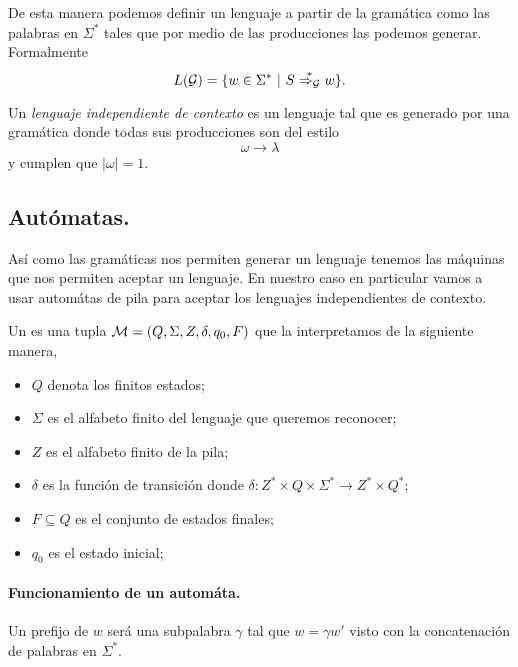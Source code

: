 \documentclass[tesis.tex]{subfiles}
\begin{document}
De esta manera podemos definir un lenguaje a partir de la gramática como las palabras en $\Sigma^*$ tales que por medio de las producciones las podemos generar. Formalmente
\[
L({\cal G}) = \{ w \in \Sigma^* \ | \ S \overset{*}{\Rightarrow_{\cal G}} w   \}.
\]



Un \textit{lenguaje independiente de contexto} es un lenguaje tal que es generado por una gramática donde todas sus producciones son del estilo
\[
 \omega \to \lambda
\]
y cumplen que $|\omega| = 1$. 

\begin{ej}
	
\end{ej}

\subsection{Autómatas.}
Así como las gramáticas nos permiten generar un lenguaje tenemos las máquinas que nos permiten aceptar un lenguaje. En nuestro caso en particular vamos a usar automátas de pila para aceptar los lenguajes independientes de contexto.

\begin{deff}
	Un  es una tupla ${\cal M } = (Q, \Sigma, Z, \delta, q_0, F)$ que la interpretamos de la siguiente manera,
	\begin{itemize}
		\item $Q$ denota los finitos estados;
		\item $\Sigma$ es el alfabeto finito del lenguaje que queremos reconocer;
		\item $Z$ es el alfabeto finito de la pila;
		\item $\delta$ es la función de transición donde $\delta: Z^* \times Q \times \Sigma^* \to Z^* \times Q^*$;
		\item $F \subseteq Q$ es el conjunto de estados finales;
		\item $q_0$ es el estado inicial;
	\end{itemize}
\end{deff}

\paragraph{Funcionamiento de un automáta.}
Un prefijo de $w$ será una subpalabra $\gamma$ tal que $w=\gamma w'$ visto con la concatenación de palabras en $\Sigma^*$.
\end{document}
